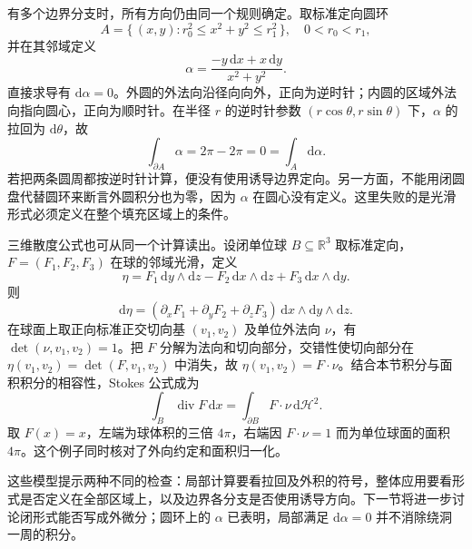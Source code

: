 \ProseParagraphBreak

有多个边界分支时，所有方向仍由同一个规则确定。取标准定向圆环
\[
 A=\{\,(x,y):r_0^2\leq x^2+y^2\leq r_1^2\,\},
 \quad 0<r_0<r_1,
\]
并在其邻域定义
\[
 \alpha=\frac{-y\,\mathrm dx+x\,\mathrm dy}{x^2+y^2}.
\]
直接求导有 \(\mathrm d\alpha=0\)。外圆的外法向沿径向向外，正向为逆时针；内圆的区域外法向指向圆心，正向为顺时针。在半径 \(r\) 的逆时针参数
\((r\cos\theta,r\sin\theta)\) 下，\(\alpha\) 的拉回为 \(\mathrm d\theta\)，故
\[
 \int_{\partial A}\alpha=2\pi-2\pi=0=\int_A\mathrm d\alpha.
\]
若把两条圆周都按逆时针计算，便没有使用诱导边界定向。另一方面，不能用闭圆盘代替圆环来断言外圆积分也为零，因为 \(\alpha\) 在圆心没有定义。这里失败的是光滑形式必须定义在整个填充区域上的条件。

\ProseParagraphBreak

三维散度公式也可从同一个计算读出。设闭单位球 \(B\subseteq\mathbb R^3\) 取标准定向，\(F=(F_1,F_2,F_3)\) 在球的邻域光滑，定义
\[
 \eta=F_1\,\mathrm dy\wedge\mathrm dz
        -F_2\,\mathrm dx\wedge\mathrm dz
        +F_3\,\mathrm dx\wedge\mathrm dy.
\]
则
\[
 \mathrm d\eta=(\partial_xF_1+\partial_yF_2+\partial_zF_3)
                        \,\mathrm dx\wedge\mathrm dy\wedge\mathrm dz.
\]
在球面上取正向标准正交切向基 \((v_1,v_2)\) 及单位外法向 \(\nu\)，有
\(\det(\nu,v_1,v_2)=1\)。把 \(F\) 分解为法向和切向部分，交错性使切向部分在
\(\eta(v_1,v_2)=\det(F,v_1,v_2)\) 中消失，故
\(\eta(v_1,v_2)=F\cdot\nu\)。结合本节积分与面积积分的相容性，Stokes 公式成为
\[
 \int_B\operatorname{div}F\,\mathrm dx
     =\int_{\partial B}F\cdot\nu\,\mathrm d\mathcal H^2.
\]
取 \(F(x)=x\)，左端为球体积的三倍 \(4\pi\)，右端因 \(F\cdot\nu=1\) 而为单位球面的面积 \(4\pi\)。这个例子同时核对了外向约定和面积归一化。

\ProseParagraphBreak

这些模型提示两种不同的检查：局部计算要看拉回及外积的符号，整体应用要看形式是否定义在全部区域上，以及边界各分支是否使用诱导方向。下一节将进一步讨论闭形式能否写成外微分；圆环上的 \(\alpha\) 已表明，局部满足 \(\mathrm d\alpha=0\) 并不消除绕洞一周的积分。
